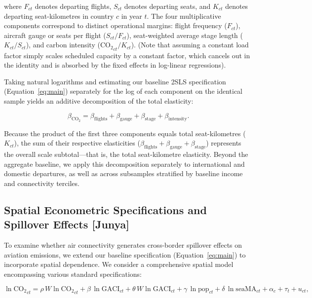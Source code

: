 \documentclass[12pt]{extarticle}
\begin{document}
where $F_{ct}$ denotes departing flights, $S_{ct}$ denotes departing seats, and $K_{ct}$ denotes departing seat-kilometres in country $c$ in year $t$. The four multiplicative components correspond to distinct operational margins: flight frequency ($F_{ct}$), aircraft gauge or seats per flight ($S_{ct}/F_{ct}$), seat-weighted average stage length ($K_{ct}/S_{ct}$), and carbon intensity ($\mathrm{CO_2}_{ct}/K_{ct}$). (Note that assuming a constant load factor simply scales scheduled capacity by a constant factor, which cancels out in the identity and is absorbed by the fixed effects in log-linear regressions).

Taking natural logarithms and estimating our baseline 2SLS specification (Equation~\ref{eq:main}) separately for the log of each component on the identical sample yields an additive decomposition of the total elasticity:

\begin{equation}
\beta_{\mathrm{CO_2}} = \beta_{\mathrm{flights}} + \beta_{\mathrm{gauge}} +
\beta_{\mathrm{stage}} + \beta_{\mathrm{intensity}}.
\label{eq:decomp}
\end{equation}

Because the product of the first three components equals total seat-kilometres ($K_{ct}$), the sum of their respective elasticities ($\beta_{\mathrm{flights}} + \beta_{\mathrm{gauge}} + \beta_{\mathrm{stage}}$) represents the overall scale subtotal—that is, the total seat-kilometre elasticity. Beyond the aggregate baseline, we apply this decomposition separately to international and domestic departures, as well as across subsamples stratified by baseline income and connectivity terciles.

\subsection*{Spatial Econometric Specifications and Spillover Effects [Junya]}

To examine whether air connectivity generates cross-border spillover effects on aviation emissions, we extend our baseline specification (Equation~\ref{eq:main}) to incorporate spatial dependence. We consider a comprehensive spatial model encompassing various standard specifications:

\begin{equation}
\ln \mathrm{CO_2}_{ct} = \rho \, W \ln \mathrm{CO_2}_{ct} + \beta \,\ln \mathrm{GACI}_{ct} + \theta \, W \ln \mathrm{GACI}_{ct}
 + \gamma \,\ln \mathrm{pop}_{ct} + \delta \,\ln \mathrm{seaMA}_{ct} + \alpha_c + \tau_t + u_{ct},
\label{eq:spatial_general}
\end{equation}
\end{document}
